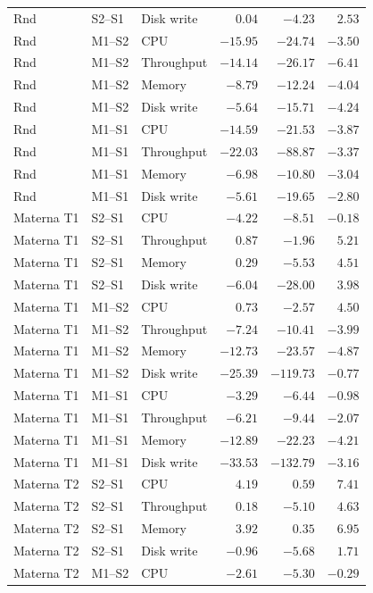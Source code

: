 \documentclass[a4paper,11pt]{article}
\begin{document}
\begin{longtable}{@{}lllrrr@{}}
  Rnd & S2--S1 & Disk write & $ 0.04$ & $-4.23$ & $ 2.53$ \\
  Rnd & M1--S2 & CPU & $-15.95$ & $-24.74$ & $-3.50$ \\
  Rnd & M1--S2 & Throughput & $-14.14$ & $-26.17$ & $-6.41$ \\
  Rnd & M1--S2 & Memory & $-8.79$ & $-12.24$ & $-4.04$ \\
  Rnd & M1--S2 & Disk write & $-5.64$ & $-15.71$ & $-4.24$ \\
  Rnd & M1--S1 & CPU & $-14.59$ & $-21.53$ & $-3.87$ \\
  Rnd & M1--S1 & Throughput & $-22.03$ & $-88.87$ & $-3.37$ \\
  Rnd & M1--S1 & Memory & $-6.98$ & $-10.80$ & $-3.04$ \\
  Rnd & M1--S1 & Disk write & $-5.61$ & $-19.65$ & $-2.80$ \\
  Materna T1 & S2--S1 & CPU & $-4.22$ & $-8.51$ & $-0.18$ \\
  Materna T1 & S2--S1 & Throughput & $ 0.87$ & $-1.96$ & $ 5.21$ \\
  Materna T1 & S2--S1 & Memory & $ 0.29$ & $-5.53$ & $ 4.51$ \\
  Materna T1 & S2--S1 & Disk write & $-6.04$ & $-28.00$ & $ 3.98$ \\
  Materna T1 & M1--S2 & CPU & $ 0.73$ & $-2.57$ & $ 4.50$ \\
  Materna T1 & M1--S2 & Throughput & $-7.24$ & $-10.41$ & $-3.99$ \\
  Materna T1 & M1--S2 & Memory & $-12.73$ & $-23.57$ & $-4.87$ \\
  Materna T1 & M1--S2 & Disk write & $-25.39$ & $-119.73$ & $-0.77$ \\
  Materna T1 & M1--S1 & CPU & $-3.29$ & $-6.44$ & $-0.98$ \\
  Materna T1 & M1--S1 & Throughput & $-6.21$ & $-9.44$ & $-2.07$ \\
  Materna T1 & M1--S1 & Memory & $-12.89$ & $-22.23$ & $-4.21$ \\
  Materna T1 & M1--S1 & Disk write & $-33.53$ & $-132.79$ & $-3.16$ \\
  Materna T2 & S2--S1 & CPU & $ 4.19$ & $ 0.59$ & $ 7.41$ \\
  Materna T2 & S2--S1 & Throughput & $ 0.18$ & $-5.10$ & $ 4.63$ \\
  Materna T2 & S2--S1 & Memory & $ 3.92$ & $ 0.35$ & $ 6.95$ \\
  Materna T2 & S2--S1 & Disk write & $-0.96$ & $-5.68$ & $ 1.71$ \\
  Materna T2 & M1--S2 & CPU & $-2.61$ & $-5.30$ & $-0.29$ \\

\end{longtable}
\end{document}
